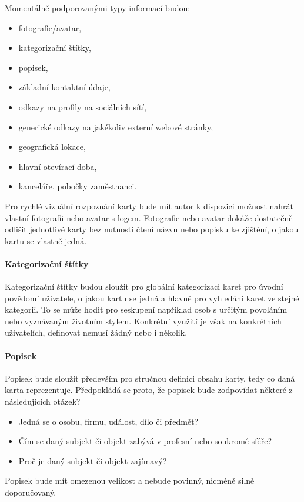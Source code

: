 	Momentálně podporovanými typy informací budou:
	\begin{itemize}
		\item fotografie/avatar,
		\item kategorizační štítky,
		\item popisek,
		\item základní kontaktní údaje,
		\item odkazy na profily na sociálních sítí,
		\item generické odkazy na jakékoliv externí webové stránky,
		\item geografická lokace,
		\item hlavní otevírací doba,
		\item kanceláře, pobočky zaměstnanci.
	\end{itemize}

	Pro rychlé vizuální rozpoznání karty bude mít autor k dispozici možnost nahrát vlastní fotografii nebo avatar s logem.
	Fotografie nebo avatar dokáže dostatečně odlišit jednotlivé karty bez nutnosti čtení názvu nebo popisku ke zjištění, o
	jakou kartu se vlastně jedná.

	\paragraph{Kategorizační štítky}

	Kategorizační štítky budou sloužit pro globální kategorizaci karet pro úvodní povědomí uživatele, o jakou kartu se jedná
	a hlavně pro vyhledání karet ve stejné kategorii.
	To se může hodit pro seskupení například osob s určitým povoláním nebo vyznávaným životním stylem.
	Konkrétní využití je však na konkrétních uživatelích, definovat nemusí žádný nebo i několik.

	\paragraph{Popisek}

	Popisek bude sloužit především pro stručnou definici obsahu karty, tedy co daná karta reprezentuje.
	Předpokládá se proto, že popisek bude zodpovídat některé z následujících otázek?
	\begin{itemize}
		\item Jedná se o osobu, firmu, událost, dílo či předmět?
		\item Čím se daný subjekt či objekt zabývá v profesní nebo soukromé sféře?
		\item Proč je daný subjekt či objekt zajímavý?
	\end{itemize}
	Popisek bude mít omezenou velikost a nebude povinný, nicméně silně doporučovaný.

